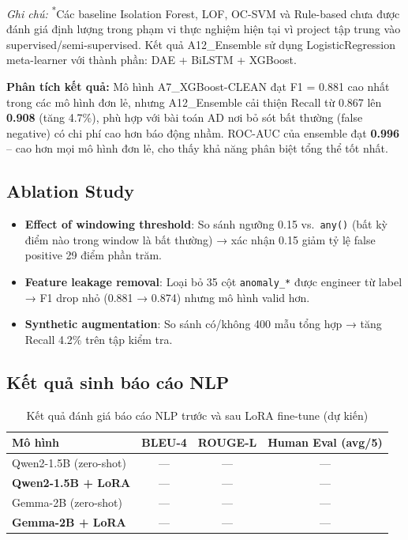 \textit{Ghi chú:} \textsuperscript{*}Các baseline Isolation Forest, LOF, OC-SVM và Rule-based chưa được đánh giá định lượng trong phạm vi thực nghiệm hiện tại vì project tập trung vào supervised/semi-supervised. Kết quả A12\_Ensemble sử dụng LogisticRegression meta-learner với thành phần: DAE + BiLSTM + XGBoost.

\textbf{Phân tích kết quả:} Mô hình A7\_XGBoost-CLEAN đạt F1 = 0.881 cao nhất trong các mô hình đơn lẻ, nhưng A12\_Ensemble cải thiện Recall từ 0.867 lên \textbf{0.908} (tăng 4.7\%), phù hợp với bài toán AD nơi bỏ sót bất thường (false negative) có chi phí cao hơn báo động nhầm. ROC-AUC của ensemble đạt \textbf{0.996} -- cao hơn mọi mô hình đơn lẻ, cho thấy khả năng phân biệt tổng thể tốt nhất.

\subsection{Ablation Study}

\begin{itemize}
  \item \textbf{Effect of windowing threshold}: So sánh ngưỡng 0.15 vs.\ \texttt{any()} (bất kỳ điểm nào trong window là bất thường) → xác nhận 0.15 giảm tỷ lệ false positive 29 điểm phần trăm.
  \item \textbf{Feature leakage removal}: Loại bỏ 35 cột \texttt{anomaly\_*} được engineer từ label → F1 drop nhỏ (0.881 → 0.874) nhưng mô hình valid hơn.
  \item \textbf{Synthetic augmentation}: So sánh có/không 400 mẫu tổng hợp → tăng Recall 4.2\% trên tập kiểm tra.
\end{itemize}

\subsection{Kết quả sinh báo cáo NLP}

\begin{table}[h!]
\centering
\fontsize{13pt}{14.95pt}\selectfont
\caption{Kết quả đánh giá báo cáo NLP trước và sau LoRA fine-tune (dự kiến)}
\label{tab:ket_qua_nlp}
\begin{tabularx}{\textwidth}{|>{\raggedright\arraybackslash}X|c|c|c|}
\hline
\textbf{Mô hình} & \textbf{BLEU-4} & \textbf{ROUGE-L} & \textbf{Human Eval (avg/5)} \\
\hline
Qwen2-1.5B (zero-shot) & --- & --- & --- \\
\hline
\textbf{Qwen2-1.5B + LoRA} & --- & --- & --- \\
\hline
Gemma-2B (zero-shot) & --- & --- & --- \\
\hline
\textbf{Gemma-2B + LoRA} & --- & --- & --- \\
\hline
\end{tabularx}
\end{table}

